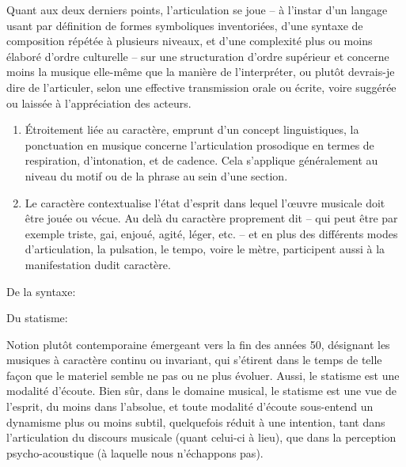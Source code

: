 \documentclass{article}
\newcommand{\myuline}[1]{%
  \uline{\phantom{#1}}%
  \llap{{#1}}%
}
\begin{document}
Quant aux deux derniers points, l'articulation se joue -- à l'instar d'un langage usant par définition de formes symboliques inventoriées, d'une syntaxe de composition répétée à plusieurs niveaux, et d'une complexité plus ou moins élaboré d'ordre culturelle -- sur une structuration d'ordre supérieur et concerne moins la musique elle-même que la manière de l'interpréter, ou plutôt devrais-je dire de l'articuler, selon une effective transmission orale ou écrite, voire suggérée ou laissée à l'appréciation des acteurs. 

\begin{enumerate}[resume]

\item \myuline{Ponctuation}

Étroitement liée au caractère,  emprunt d'un concept linguistiques, la ponctuation en musique concerne l'articulation prosodique en termes de respiration, d'intonation, et de cadence. Cela s'applique généralement au niveau du motif ou de la phrase au sein d'une section.

\item \myuline{Caractère}

Le caractère contextualise l'état d'esprit dans lequel l'œuvre musicale doit être jouée ou vécue. Au delà du caractère proprement dit -- qui peut être par exemple triste, gai, enjoué, agité, léger, etc. -- et en plus des différents modes d'articulation, la pulsation, le tempo, voire le mètre, participent aussi à la manifestation dudit caractère.

\end{enumerate}

\bigskip

De la syntaxe:

\smallskip


\bigskip

Du statisme:

\smallskip 

\noindent Notion plutôt contemporaine émergeant vers la fin des années 50, désignant les musiques à caractère continu ou invariant, qui s'étirent dans le temps de telle façon que le materiel semble ne pas ou ne plus évoluer.  Aussi, le statisme est une modalité d'écoute. 
Bien sûr, dans le domaine musical, le statisme est une vue de l'esprit, du moins dans l'absolue, et toute modalité d'écoute sous-entend un dynamisme plus ou moins subtil, quelquefois réduit à une intention, tant dans l'articulation du discours musicale (quant celui-ci à lieu), que dans la perception psycho-acoustique (à laquelle nous n'échappons pas).
\end{document}

